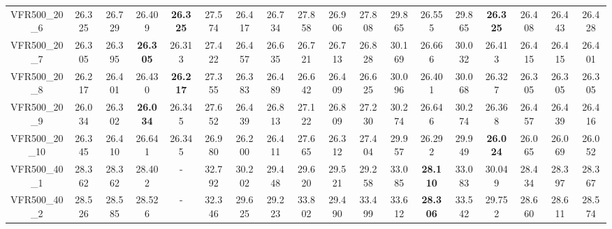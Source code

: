 \begin{tabular}{cc|ccc|ccccccccccccc}
VFR500\_20\_6      & 26.325           & 26.729           & 26.409           & {\bf 26.325}     & 27.574           & 26.417           & 26.734           & 27.858           & 26.906           & 27.808           & 29.865           & 26.555           & 29.865           & {\bf 26.325}     & 26.408           & 26.443           & 26.428          \\ 
VFR500\_20\_7      & 26.305           & 26.395           & {\bf 26.305}     & 26.313           & 27.422           & 26.457           & 26.635           & 26.721           & 26.713           & 26.828           & 30.169           & 26.666           & 30.032           & 26.413           & 26.415           & 26.415           & 26.401          \\ 
VFR500\_20\_8      & 26.217           & 26.401           & 26.430           & {\bf 26.217}     & 27.355           & 26.383           & 26.489           & 26.642           & 26.409           & 26.625           & 30.096           & 26.401           & 30.068           & 26.327           & 26.305           & 26.305           & 26.305          \\ 
VFR500\_20\_9      & 26.034           & 26.302           & {\bf 26.034}     & 26.345           & 27.652           & 26.439           & 26.813           & 27.122           & 26.809           & 27.230           & 30.274           & 26.646           & 30.274           & 26.368           & 26.457           & 26.439           & 26.416          \\ 
VFR500\_20\_10     & 26.345           & 26.410           & 26.641           & 26.345           & 26.980           & 26.200           & 26.411           & 27.665           & 26.312           & 27.404           & 29.957           & 26.292           & 29.949           & {\bf 26.024}     & 26.065           & 26.069           & 26.052          \\ 
VFR500\_40\_1      & 28.362           & 28.362           & 28.402           & -                & 32.792           & 30.202           & 29.448           & 29.620           & 29.521           & 29.258           & 33.085           & {\bf 28.110}     & 33.083           & 30.049           & 28.434           & 28.397           & 28.367          \\ 
VFR500\_40\_2      & 28.526           & 28.585           & 28.526           & -                & 32.346           & 29.625           & 29.223           & 33.802           & 29.490           & 33.499           & 33.612           & {\bf 28.306}     & 33.542           & 29.752           & 28.660           & 28.611           & 28.574          \\ 

\end{tabular}
